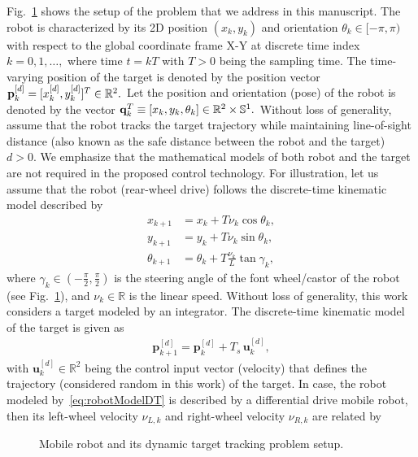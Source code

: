 \documentclass[conference]{IEEEtran}
\begin{document}
Fig.~\ref{fig:leaderFollowerSetup} shows the setup of the problem that we address in this manuscript. The robot is characterized by its 2D position $(x_k,y_k)$ and orientation $\theta_k\in[-\pi,\pi)$ with respect to the global coordinate frame X-Y at discrete time index $k=0,1,\ldots,$ where time $t=kT$ with $T>0$ being the sampling time. The time-varying position of the target is denoted by the position vector ${\bf p}_k^{[d]}= [x_k^{[d]},y_k^{[d]}]^T\in\mathbb{R}^2.$  Let the position and orientation (pose) of the robot is denoted by the vector  ${\bf q}_k^T\equiv[x_k,y_k,\theta_k]\in\mathbb{R}^2\times\mathbb{S}^1.$ Without loss of generality, assume that the robot tracks the target trajectory while maintaining line-of-sight distance (also known as the safe distance between the robot and the target) $d>0.$ We emphasize that the mathematical models of both robot and the target are not required in the proposed control technology. For illustration, let us assume that the robot (rear-wheel drive) follows the discrete-time kinematic model described by %
%
\begin{subequations}
  \label{eq:robotModelDT}  
  \begin{align}
    x_{k+1} &= x_k +T\nu_k\cos\theta_k,\\
    y_{k+1} &= y_k +T\nu_k\sin\theta_k,\\
    \theta_{k+1} &= \theta_k + T\frac{\nu_k}{L}\tan\gamma_k,
  \end{align}
\end{subequations}
%
where $\gamma_k\in(-\frac{\pi}{2},\frac{\pi}{2})$ is the steering angle of the font wheel/castor of the robot (see Fig.~\ref{fig:leaderFollowerSetup}), and $\nu_k\in\mathbb{R}$ is the linear speed. Without loss of generality, this work considers a target modeled by an integrator. The discrete-time kinematic model of the target is given as %
%
 \begin{align}
   \label{eq:leaderDT}
   \mathbf{p}_{k+1}^{[d]} = \mathbf{p}_k^{[d]} + T_s \, \mathbf{u}_k^{[d]},
 \end{align}
% 
 with $\mathbf{u}_k^{[d]}\in\mathbb{R}^2$ being the control input vector (velocity) that defines the trajectory (considered random in this work) of the target.  In case, the robot modeled by~\eqref{eq:robotModelDT} is described by a differential drive mobile robot, then its left-wheel velocity $\nu_{L,k}$ and right-wheel velocity $\nu_{R,k}$ are related by
  \begin{figure}
   \centering
   \caption{Mobile robot and its dynamic target tracking problem setup. }
   \label{fig:leaderFollowerSetup}
 \end{figure}
\end{document}

